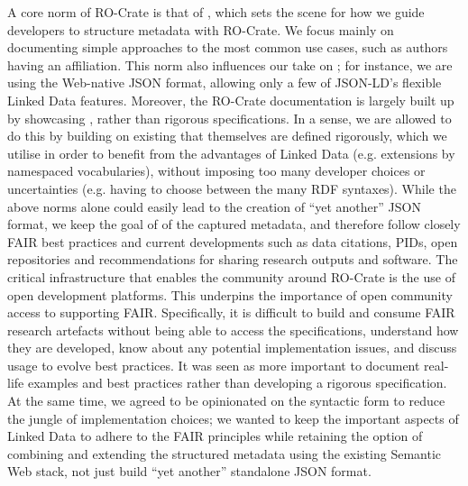 {}A core norm of RO-Crate is that of , which sets the scene for how we guide developers to structure metadata with RO-Crate. We focus mainly on documenting simple approaches to the most common use cases, such as authors having an affiliation. This norm also influences our take on ; for instance, we are using the Web-native JSON format, allowing only a few of JSON-LD's flexible Linked Data features. Moreover, the RO-Crate documentation is largely built up by  showcasing , rather than rigorous specifications. In a sense, we are allowed to do this by building on existing  that themselves are defined rigorously, which we utilise  in order to benefit from the advantages of Linked Data (e.g. extensions by namespaced vocabularies), without imposing too many developer choices or uncertainties (e.g. having to choose between the many RDF syntaxes). \markdownRendererInterblockSeparator
{}While the above norms alone could easily lead to the creation of “yet another” JSON format, we keep the goal of  of the captured metadata, and therefore follow closely FAIR best practices and current developments such as data citations, PIDs, open repositories and recommendations for sharing research outputs and software.\markdownRendererInterblockSeparator
{}\markdownRendererInterblockSeparator
{}The critical infrastructure that enables the community around RO-Crate is the use of open development platforms. This underpins the importance of open community access to supporting FAIR. Specifically, it is difficult to build and consume FAIR research artefacts without being able to access the specifications, understand how they are developed, know about any potential implementation issues, and discuss usage to evolve best practices. \markdownRendererInterblockSeparator
{}It was seen as more important to document real-life examples and best practices rather than developing a rigorous specification. At the same time, we agreed to be opinionated on the syntactic form to reduce the jungle of implementation choices; we wanted to keep the important aspects of Linked Data to adhere to the FAIR principles while retaining the option of combining and extending the structured metadata using the existing Semantic Web stack, not just build “yet another” standalone JSON format. \markdownRendererInterblockSeparator
